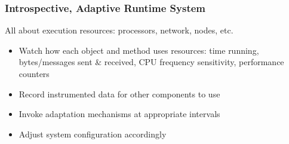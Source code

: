 \begin{frame}
\frametitle{Introspective, Adaptive Runtime System}
All about execution resources: processors, network, nodes, etc.
\begin{itemize}
\item Watch how each object and method uses resources: time running, bytes/messages sent & received, CPU frequency sensitivity, performance counters
\item Record instrumented data for other components to use
\item Invoke adaptation mechanisms at appropriate intervals
\item Adjust system configuration accordingly
\end{itemize}
\end{frame}
